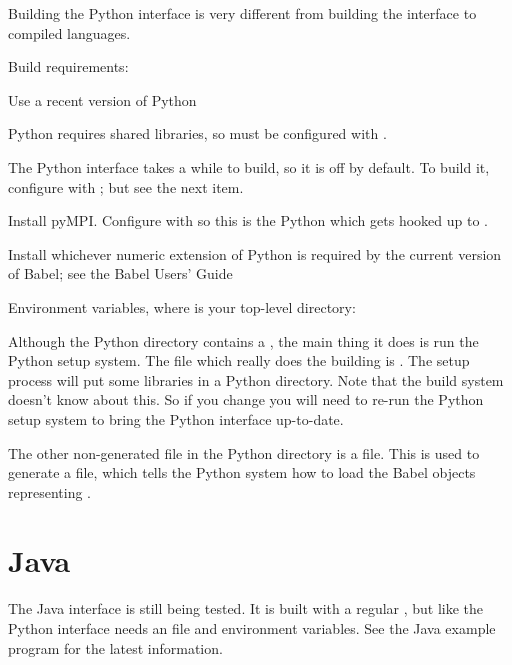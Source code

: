 Building the Python interface is very different from building the
interface to compiled languages.

Build requirements:
\begin{list}{.}{\setlength{\itemsep}{0in}}
\item Use a recent version of Python
\item Python requires shared libraries, so \hypre{} must be configured
with .
\item The Python interface takes a while to build, so it is off by
default.  To build it, configure \hypre{} with ;
but see the next item.
\item Install pyMPI.  Configure \hypre{} with  so
this is the Python which gets hooked up to \hypre{}.
\item Install whichever numeric extension of Python is required by the
current version of Babel; see the Babel Users' Guide
\item Environment variables, where  is your top-level
\hypre{} directory:
 \newline
 \newline
\end{list}

Although the Python directory contains a , the main
thing it does is run the Python setup system. The file which really
does the building is . The setup process will put some
\hypre{} libraries in a Python directory.  Note that the \hypre{}
build system doesn't know about this.  So if you change \hypre{} you
will need to re-run the Python setup system to bring the Python
interface up-to-date.

The other non-generated file in the Python directory
 is a  file.  This is used to
generate a  file, which tells the Python system how to load
the Babel objects representing \hypre{}.

\section{Java}

The Java interface is still being tested.  It is built with a regular
, but like the Python interface needs an  file and
environment variables.  See the Java example program  for
the latest information.

